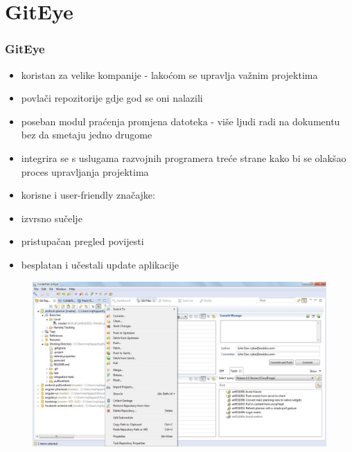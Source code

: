 \section{GitEye}
\begin{frame}[allowframebreaks]
\frametitle{GitEye}
 
\begin{itemize}
 \item koristan za velike kompanije - lakoćom se upravlja važnim projektima
 \item povlači repozitorije gdje god se oni nalazili
 \item poseban modul praćenja promjena datoteka - više ljudi radi na dokumentu bez da smetaju jedno drugome
 \item integrira se s uslugama razvojnih programera treće strane kako bi se olakšao proces upravljanja projektima
 \framebreak
 \item korisne i user-friendly značajke:
 		\item izvrsno sučelje
 		\item pristupačan pregled povijesti
 		\item besplatan i učestali update aplikacije
\end{itemize}

\begin{figure}
	\includegraphics[width=0.9\linewidth]{images/git-eye.jpeg}
\end{figure}
\end{frame}

